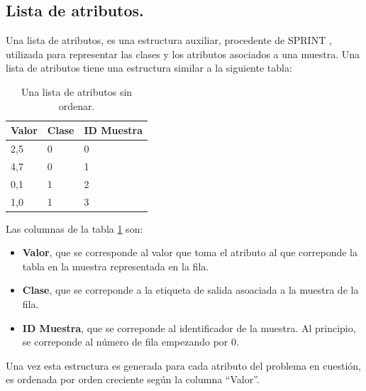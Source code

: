 \subsection{Lista de atributos.}
Una lista de atributos, es una estructura auxiliar, procedente de SPRINT \cite{sprint}, utilizada para representar las clases y los atributos asociados a una muestra. Una lista de atributos tiene una estructura similar a la siguiente tabla:

\begin{table}[ht]
\centering
\begin{tabular}{@{}lll@{}}
\toprule
Valor & Clase & ID Muestra \\ \midrule
2,5   & 0     & 0          \\
4,7   & 0     & 1          \\
0,1   & 1     & 2          \\
1,0   & 1     & 3          \\ \bottomrule
\end{tabular}
\caption{Una lista de atributos sin ordenar.}
\label{tab:ejlistaatributos}
\end{table}

Las columnas de la tabla \ref{tab:ejlistaatributos} son:
\begin{itemize}
	\item \textbf{Valor}, que se corresponde al valor que toma el atributo al que correponde la tabla en la muestra representada en la fila.
	\item \textbf{Clase}, que se correponde a la etiqueta de salida asoaciada a la muestra de la fila.
	\item \textbf{ID Muestra}, que se correponde al identificador de la muestra. Al principio, se correponde al número de fila empezando por 0.
\end{itemize}

Una vez esta estructura es generada para cada atributo del problema en cuestión, es ordenada por orden creciente según la columna ``Valor''.


